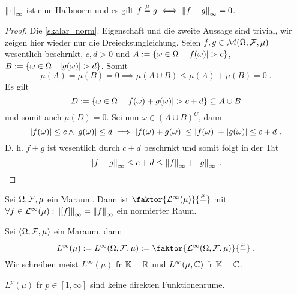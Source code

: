\begin{theorem}
	\(\left\lVert\cdot\right\rVert_\infty\) ist eine Halbnorm und es gilt \(f\overset{\mu}{=} g \iff \left\lVert f-g\right\rVert_\infty = 0\).
\end{theorem}
\begin{proof}
	Die \ref{skalar_norm}. Eigenschaft und die zweite Aussage sind trivial, wir zeigen hier wieder nur die Dreiecksungleichung. Seien \(f,g \in \mathcal{M}(\Omega, \mathcal{F}, \mu)\) wesentlich beschr\as nkt, \(c,d > 0\) und \(A := \left\{\omega \in \Omega\;\vert\; \left\lvert f(\omega) \right\rvert > c\right\}\), \(B : = \left\{\omega\in\Omega\;\vert\;\left\lvert g(\omega) \right\rvert > d\right\}\). Somit 
	\[\mu(A) = \mu(B) = 0 \implies \mu(A\cup B) \leq \mu(A) + \mu(B) = 0\;.\]
	Es gilt 
	\[D: = \left\{\omega\in\Omega\;\vert\;\left\lvert f(\omega) + g(\omega) \right\rvert > c+d\right\} \subseteq A\cup B \]
	 und somit auch \(\mu(D) = 0\).
	Sei nun \(\omega \in (A\cup B)^C\), dann \[\left\lvert f(\omega) \right\rvert \leq c \land \left\lvert g(\omega) \right\rvert \leq d \implies \left\lvert f(\omega) + g(\omega) \right\rvert \leq \left\lvert f(\omega) \right\rvert + \left\lvert g(\omega) \right\rvert \leq c+d\;.\]
	D. h. \(f+g\) ist wesentlich durch \(c+d\) beschr\as nkt und somit folgt in der Tat
	\[\left\lVert f+g\right\rVert_\infty \leq c+d \leq \left\lVert f\right\rVert_\infty + \left\lVert g\right\rVert_\infty\;.\]
\end{proof}

\begin{theorem}
	Sei \(\Omega, \mathcal{F}, \mu\) ein Ma\s raum. Dann ist \(\faktor{\p^\infty(\mu)}{\muq}\) mit \(\forall f \in \mathcal{L}^\infty(\mu): \left\lVert\left[ f\right]\right\rVert_\infty = \left\lVert f\right\rVert_\infty\) ein normierter Raum.
\end{theorem}

\begin{definition}
	Sei \((\Omega,\mathcal{F}, \mu)\) ein Ma\s raum, dann 
	\[L^\infty(\mu) := L^\infty(\Omega,\mc F, \mu) := \faktor{\p^\infty(\Omega, \mc F, \mu)}{\muq}\;.\]
	Wir schreiben meist \(L^\infty(\mu)\) f\us r \(\mathbb{K} = \mathbb{R}\) und \(L^\infty(\mu, \mathbb{C})\) f\us r \(\mathbb{K} = \mathbb{C}\).
\end{definition}

\begin{rem}
	\(L^p(\mu)\) f\us r \(p \in [1,\infty]\) sind keine direkten Funktionenr\as ume.
\end{rem}

